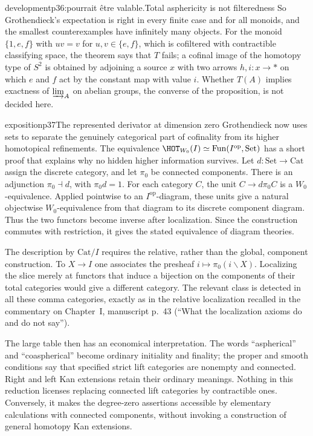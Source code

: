 \begin{dcomment}{development}{p36:pourrait être valable.}{Total asphericity is not filteredness}
So Grothendieck's expectation is right in every finite case and for all monoids, and the smallest counterexamples have infinitely many objects. For the monoid $\{1,e,f\}$ with $uv=v$ for $u,v\in\{e,f\}$, which is cofiltered with contractible classifying space, the theorem says that $T$ fails; a cofinal image of the homotopy type of $S^2$ is obtained by adjoining a source $x$ with two arrows $h,i:x\to*$ on which $e$ and $f$ act by the constant map with value $i$. Whether $T(A)$ implies exactness of $\varinjlim_A$ on abelian groups, the converse of the proposition, is not decided here.
\end{dcomment}

\begin{dcomment}{exposition}{p37}{The represented derivator at dimension zero}
Grothendieck now uses sets to separate the genuinely categorical part of cofinality from its higher homotopical refinements. The equivalence $\HOT_{W_0}(I)\simeq\operatorname{Fun}(I^{\mathrm{op}},\mathrm{Set})$ has a short proof that explains why no hidden higher information survives. Let $d:\mathrm{Set}\longrightarrow\mathrm{Cat}$ assign the discrete category, and let $\pi_0$ be connected components. There is an adjunction $\pi_0\dashv d$, with $\pi_0d=1$. For each category $C$, the unit $C\longrightarrow d\pi_0C$ is a $W_0$-equivalence. Applied pointwise to an $I^{\mathrm{op}}$-diagram, these units give a natural objectwise $W_0$-equivalence from that diagram to its discrete component diagram. Thus the two functors become inverse after localization. Since the construction commutes with restriction, it gives the stated equivalence of diagram theories.

The description by $\mathrm{Cat}/I$ requires the relative, rather than the global, component construction. To $X\longrightarrow I$ one associates the presheaf $i\longmapsto\pi_0(i\backslash X)$. Localizing the slice merely at functors that induce a bijection on the components of their total categories would give a different category. The relevant class is detected in all these comma categories, exactly as in the relative localization recalled in the commentary on Chapter~I, manuscript p.~43 (``What the localization axioms do and do not say'').

The large table then has an economical interpretation. The words ``aspherical'' and ``coaspherical'' become ordinary initiality and finality; the proper and smooth conditions say that specified strict lift categories are nonempty and connected. Right and left Kan extensions retain their ordinary meanings. Nothing in this reduction licenses replacing connected lift categories by contractible ones. Conversely, it makes the degree-zero assertions accessible by elementary calculations with connected components, without invoking a construction of general homotopy Kan extensions.
\end{dcomment}

